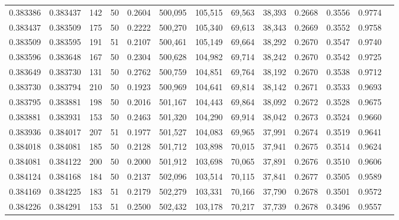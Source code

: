 \begin{tabular}{rrrrrrrrrrrrr}
0.383386 & 0.383437 &   142 &  50 &                                     0.2604 & 500,095 & 105,515 &  69,563 &  38,393 & 0.2668 & 0.3556 & 0.9774 \\
0.383437 & 0.383509 &   175 &  50 &                                     0.2222 & 500,270 & 105,340 &  69,613 &  38,343 & 0.2669 & 0.3552 & 0.9758 \\
0.383509 & 0.383595 &   191 &  51 &                                     0.2107 & 500,461 & 105,149 &  69,664 &  38,292 & 0.2670 & 0.3547 & 0.9740 \\
0.383596 & 0.383648 &   167 &  50 &                                     0.2304 & 500,628 & 104,982 &  69,714 &  38,242 & 0.2670 & 0.3542 & 0.9725 \\
0.383649 & 0.383730 &   131 &  50 &                                     0.2762 & 500,759 & 104,851 &  69,764 &  38,192 & 0.2670 & 0.3538 & 0.9712 \\
0.383730 & 0.383794 &   210 &  50 &                                     0.1923 & 500,969 & 104,641 &  69,814 &  38,142 & 0.2671 & 0.3533 & 0.9693 \\
0.383795 & 0.383881 &   198 &  50 &                                     0.2016 & 501,167 & 104,443 &  69,864 &  38,092 & 0.2672 & 0.3528 & 0.9675 \\
0.383881 & 0.383931 &   153 &  50 &                                     0.2463 & 501,320 & 104,290 &  69,914 &  38,042 & 0.2673 & 0.3524 & 0.9660 \\
0.383936 & 0.384017 &   207 &  51 &                                     0.1977 & 501,527 & 104,083 &  69,965 &  37,991 & 0.2674 & 0.3519 & 0.9641 \\
0.384018 & 0.384081 &   185 &  50 &                                     0.2128 & 501,712 & 103,898 &  70,015 &  37,941 & 0.2675 & 0.3514 & 0.9624 \\
0.384081 & 0.384122 &   200 &  50 &                                     0.2000 & 501,912 & 103,698 &  70,065 &  37,891 & 0.2676 & 0.3510 & 0.9606 \\
0.384124 & 0.384168 &   184 &  50 &                                     0.2137 & 502,096 & 103,514 &  70,115 &  37,841 & 0.2677 & 0.3505 & 0.9589 \\
0.384169 & 0.384225 &   183 &  51 &                                     0.2179 & 502,279 & 103,331 &  70,166 &  37,790 & 0.2678 & 0.3501 & 0.9572 \\
0.384226 & 0.384291 &   153 &  51 &                                     0.2500 & 502,432 & 103,178 &  70,217 &  37,739 & 0.2678 & 0.3496 & 0.9557 \\

\end{tabular}
